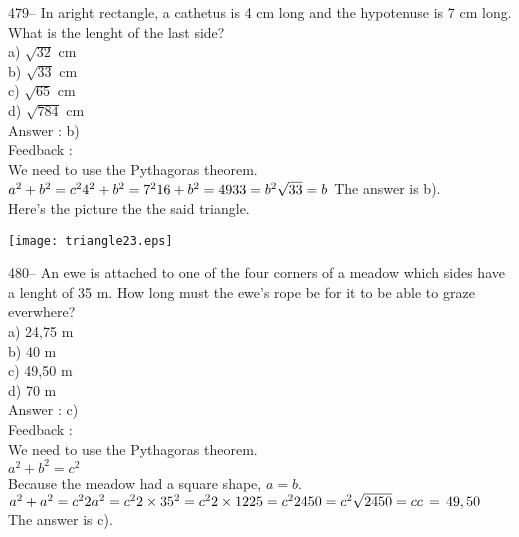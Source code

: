 \documentclass[letterpaper, 12pt]{article}
\begin{document}
479-- In aright rectangle, a cathetus is 4 cm long and
the hypotenuse is 7 cm long. What is the lenght of the last side?\\
a) $\sqrt{32}$ cm\\
b) $\sqrt{33}$ cm\\
c) $\sqrt{65}$ cm\\
d) $\sqrt{784}$ cm\\

Answer :  b)\\

Feedback : \\
We need to use the Pythagoras theorem.  \\
$a^{2}+b^{2}=c^{2}\\
4^{2}+b^{2}=7^{2}\\
16+b^{2}=49\\
33=b^{2}\\
\sqrt{33}=b\\$
The answer is b).\\
Here's the picture the the said triangle.\\
    \begin{center}
    \texttt{[image: triangle23.eps]}
    \end{center}


480--  An ewe is attached to one of the four corners of a meadow which sides have a lenght of 35 m. How long must the ewe's rope be for it to be able to graze everwhere?\\
a) 24,75 m\\
b) 40 m\\
c) 49,50 m\\
d) 70 m\\

Answer :  c)\\

Feedback : \\
We need to use the Pythagoras theorem.  \\
$a^{2}+b^{2}=c^{2}$\\
Because the meadow had a square shape, $a=b.$\\
$a^{2}+a^{2}=c^{2}\\
2a^{2}=c^{2}\\
2\times35^{2}=c^{2}\\
2\times 1225=c^{2}\\
2450=c^{2}\\
\sqrt{2450}=c\\
c\,=\,49,50$\\
The answer is c).\\
\end{document}
